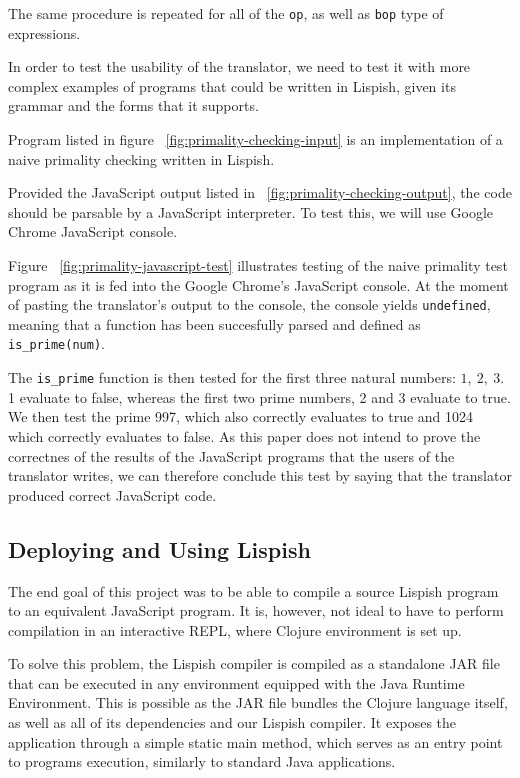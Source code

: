 The same procedure is repeated for all of the \texttt{op}, as well as \texttt{bop} type of expressions.


In order to test the usability of the translator, we need to test it with more complex examples of programs that could be written in Lispish, given its grammar and the forms that it supports.



Program listed in figure ~\ref{fig:primality-checking-input} is an implementation of a naive primality checking written in Lispish. 





Provided the JavaScript output listed in ~\ref{fig:primality-checking-output}, the code should be parsable by a JavaScript interpreter. To test this, we will use Google Chrome JavaScript console.



Figure ~\ref{fig:primality-javascript-test} illustrates testing of the naive primality test program as it is fed into the Google Chrome's JavaScript console. 
At the moment of pasting the translator's output to the console, the console yields \texttt{undefined}, meaning that a function has been succesfully parsed and defined as \texttt{is\_prime(num)}. 

The \texttt{{is\_prime}} function is then tested for the first three natural numbers: $1, \ 2, \ 3 $. 1 evaluate to false, whereas the first two prime numbers, 2 and 3 evaluate to true. We then test the prime 997, which also correctly evaluates to true and 1024 which correctly evaluates to false. 
As this paper does not intend to prove the correctnes of the results of the JavaScript programs that the users of the translator writes, we can therefore conclude this test by saying that the translator produced correct JavaScript code. 

\subsection{Deploying and Using Lispish}
The end goal of this project was to be able to compile a source Lispish program to an equivalent JavaScript program.
It is, however, not ideal to have to perform compilation in an interactive REPL, where Clojure environment is set up. 

To solve this problem, the Lispish compiler is compiled as a standalone JAR file that can be executed in any environment equipped with the Java Runtime Environment. This is possible as the JAR file bundles the Clojure language itself, as well as all of its dependencies and our Lispish compiler. It exposes the application through a simple static main method, which serves as an entry point to programs execution, similarly to standard Java applications. 

